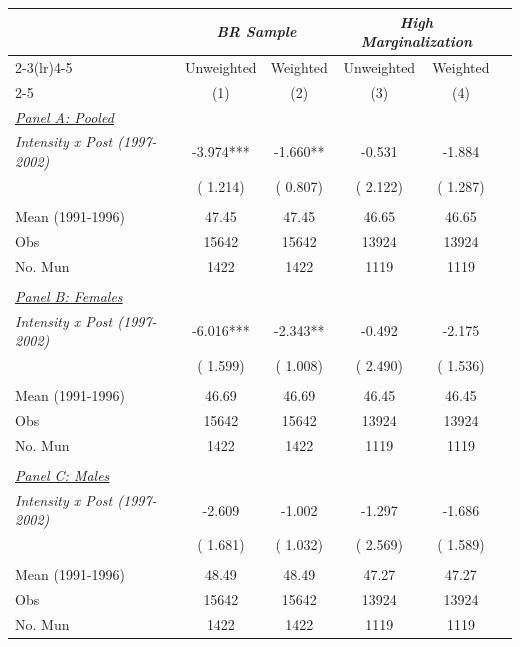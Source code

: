 \begin{tabular}{lccccc} \hline \hline
& \multicolumn{2}{c}{\textit{BR Sample}} 
& \multicolumn{2}{c}{\textit{High Marginalization}} \\ \cmidrule(lr){2-3}\cmidrule(lr){4-5}
& \multicolumn{1}{c}{Unweighted} & \multicolumn{1}{c}{Weighted} & \multicolumn{1}{c}{Unweighted} & \multicolumn{1}{c}{Weighted} \\ \cmidrule(lr){2-5}
& \multicolumn{1}{c}{(1)} & \multicolumn{1}{c}{(2)} & \multicolumn{1}{c}{(3)} & \multicolumn{1}{c}{(4)} \\ \toprule
\underline{\textit{Panel A: Pooled}} \\ 
\textit{Intensity x Post (1997-2002)}&    -3.974***&    -1.660**&    -0.531&    -1.884 \\ 
 & (    1.214)& (    0.807)& (    2.122)& (    1.287) \\ 
  & & & & \\ 
Mean (1991-1996)&     47.45&     47.45&     46.65&     46.65 \\ 
Obs&     15642&     15642&     13924&     13924 \\ 
No. Mun&      1422&      1422&      1119&      1119 \\ 
  & & & & \\ 
\underline{\textit{Panel B: Females}} \\ 
\textit{Intensity x Post (1997-2002)}&    -6.016***&    -2.343**&    -0.492&    -2.175 \\ 
 & (    1.599)& (    1.008)& (    2.490)& (    1.536) \\ 
  & & & & \\ 
Mean (1991-1996)&     46.69&     46.69&     46.45&     46.45 \\ 
Obs&     15642&     15642&     13924&     13924 \\ 
No. Mun&      1422&      1422&      1119&      1119 \\ 
  & & & & \\ 
\underline{\textit{Panel C: Males}} \\ 
\textit{Intensity x Post (1997-2002)}&    -2.609&    -1.002&    -1.297&    -1.686 \\ 
 & (    1.681)& (    1.032)& (    2.569)& (    1.589) \\ 
  & & & & \\ 
Mean (1991-1996)&     48.49&     48.49&     47.27&     47.27 \\ 
Obs&     15642&     15642&     13924&     13924 \\ 
No. Mun&      1422&      1422&      1119&      1119 \\ \bottomrule
\end{tabular}